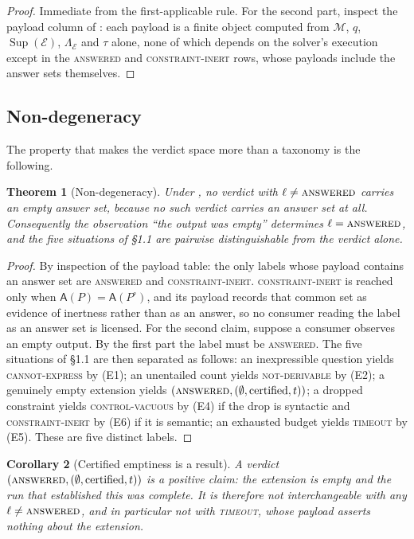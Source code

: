 \documentclass[11pt,a4paper]{article}
\theoremstyle{plain}
\newtheorem{theorem}{Theorem}[section]
\newtheorem{corollary}[theorem]{Corollary}
\theoremstyle{definition}
\theoremstyle{remark}
\newcommand{\Model}{\mathcal{M}}          %
\newcommand{\Engine}{\mathcal{E}}         %
\renewcommand{\sup}{\operatorname{Sup}}   %
\newcommand{\Ans}{\mathsf{A}}             %
\newcommand{\vans}{\textsc{answered}}
\newcommand{\vexp}{\textsc{cannot-express}}
\newcommand{\vder}{\textsc{not-derivable}}
\newcommand{\vtime}{\textsc{timeout}}
\newcommand{\vvac}{\textsc{control-vacuous}}
\newcommand{\vinert}{\textsc{constraint-inert}}
\newcommand{\lowr}{\Lambda}               %
\newcommand{\qq}{q}
\begin{document}
\begin{proof}
Immediate from the first-applicable rule. For the second part, inspect the
payload column of : each payload is a finite object computed
from $\Model$, $\qq$, $\sup(\Engine)$, $\lowr_\Engine$ and $\tau$ alone, none
of which depends on the solver's execution except in the \vans{} and \vinert{}
rows, whose payloads include the answer sets themselves.
\end{proof}

\subsection{Non-degeneracy}

The property that makes the verdict space more than a taxonomy is the
following.

\begin{theorem}[Non-degeneracy]
\label{thm:nondegeneracy}
Under , no verdict with $\ell \neq \vans$ carries an
empty answer set, because no such verdict carries an answer set at all.
Consequently the observation ``the output was empty'' determines
$\ell = \vans$, and the five situations of \S1.1 are pairwise distinguishable
from the verdict alone.
\end{theorem}

\begin{proof}
By inspection of the payload table: the only labels whose payload contains an
answer set are \vans{} and \vinert. \vinert{} is reached only when
$\Ans(P) = \Ans(P^\circ)$, and its payload records that common set as evidence
of inertness rather than as an answer, so no consumer reading the label as an
answer set is licensed. For the second claim, suppose a consumer observes an
empty output. By the first part the label must be \vans. The five situations
of \S1.1 are then separated as follows: an inexpressible question yields
\vexp{} by (E1); an unentailed count yields \vder{} by (E2); a genuinely empty
extension yields $(\vans, (\emptyset, \text{certified}, t))$; a dropped
constraint yields \vvac{} by (E4) if the drop is syntactic and \vinert{} by
(E6) if it is semantic; an exhausted budget yields \vtime{} by (E5). These are
five distinct labels.
\end{proof}

\begin{corollary}[Certified emptiness is a result]
\label{cor:certified-empty}
A verdict $(\vans, (\emptyset, \text{certified}, t))$ is a positive claim:
the extension is empty and the run that established this was complete. It is
therefore not interchangeable with any $\ell \neq \vans$, and in particular
not with \vtime, whose payload asserts nothing about the extension.
\end{corollary}
\end{document}
